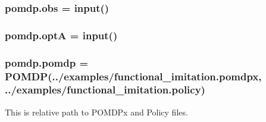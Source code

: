 \subsubsection[{\texorpdfstring{obs}{obs}}]{\setlength{\rightskip}{0pt plus 5cm}pomdp.\+obs = input()}\hypertarget{namespacepomdp_a7d45d88aa25dba39219b60c7df2d7756}{}\label{namespacepomdp_a7d45d88aa25dba39219b60c7df2d7756}
\subsubsection[{\texorpdfstring{optA}{optA}}]{\setlength{\rightskip}{0pt plus 5cm}pomdp.\+optA = input()}\hypertarget{namespacepomdp_a4901c11b2c53920cbc58185f0c1b58b5}{}\label{namespacepomdp_a4901c11b2c53920cbc58185f0c1b58b5}
\subsubsection[{\texorpdfstring{pomdp}{pomdp}}]{\setlength{\rightskip}{0pt plus 5cm}pomdp.\+pomdp = {\bf P\+O\+M\+DP}(\textquotesingle{}../examples/functional\+\_\+imitation.\+pomdpx\textquotesingle{}, \textquotesingle{}../examples/functional\+\_\+imitation.\+policy\textquotesingle{})}\hypertarget{namespacepomdp_a0b6ef2c8e7953321eef83e0706e8316f}{}\label{namespacepomdp_a0b6ef2c8e7953321eef83e0706e8316f}


This is relative path to P\+O\+M\+D\+Px and Policy files. 

